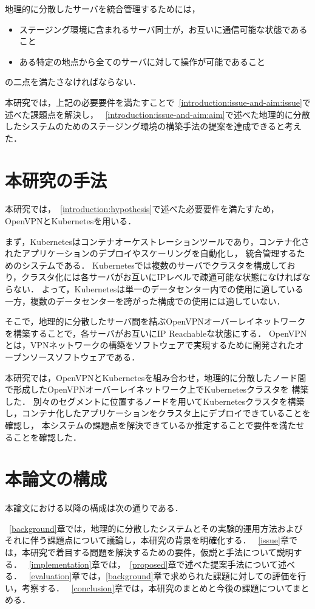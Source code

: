 地理的に分散したサーバを統合管理するためには，
\begin{itemize}
  \item ステージング環境に含まれるサーバ同士が，お互いに通信可能な状態であること
  \item ある特定の地点から全てのサーバに対して操作が可能であること
\end{itemize}
の二点を満たさなければならない．

本研究では，上記の必要要件を満たすことで~\ref{introduction:issue-and-aim:issue}で述べた課題点を解決し，
~\ref{introduction:issue-and-aim:aim}で述べた地理的に分散したシステムのためのステージング環境の構築手法の提案を達成できると考えた．

\section{本研究の手法}
\label{introduction:proposal}

本研究では，~\ref{introduction:hypothesis}で述べた必要要件を満たすため，OpenVPNとKubernetesを用いる．

まず，Kubernetesはコンテナオーケストレーションツールであり，コンテナ化されたアプリケーションのデプロイやスケーリングを自動化し，
統合管理するためのシステムである．
Kubernetesでは複数のサーバでクラスタを構成しており，クラスタ化には各サーバがお互いにIPレベルで疎通可能な状態になければならない．
よって，Kubernetesは単一のデータセンター内での使用に適している一方，複数のデータセンターを跨がった構成での使用には適していない．

そこで，地理的に分散したサーバ間を結ぶOpenVPNオーバーレイネットワークを構築することで，各サーバがお互いにIP Reachableな状態にする．
OpenVPNとは，VPNネットワークの構築をソフトウェアで実現するために開発されたオープンソースソフトウェアである．

本研究では，OpenVPNとKubernetesを組み合わせ，地理的に分散したノード間で形成したOpenVPNオーバーレイネットワーク上でKubernetesクラスタを
構築した．
別々のセグメントに位置するノードを用いてKubernetesクラスタを構築し，コンテナ化したアプリケーションをクラスタ上にデプロイできていることを確認し，
本システムの課題点を解決できているか推定することで要件を満たせることを確認した．

\section{本論文の構成}
\label{introduction:structure}

本論文における以降の構成は次の通りである．

~\ref{background}章では，地理的に分散したシステムとその実験的運用方法およびそれに伴う課題点について議論し，本研究の背景を明確化する．
~\ref{issue}章では，本研究で着目する問題を解決するための要件，仮説と手法について説明する．
~\ref{implementation}章では，~\ref{proposed}章で述べた提案手法について述べる．
~\ref{evaluation}章では，\ref{background}章で求められた課題に対しての評価を行い，考察する．
~\ref{conclusion}章では，本研究のまとめと今後の課題についてまとめる．

